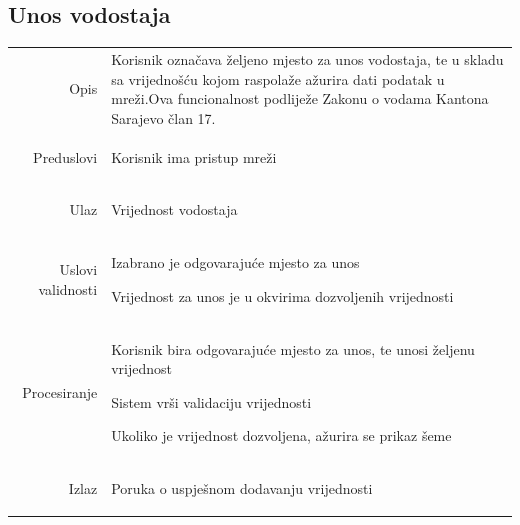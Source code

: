 \documentclass[]{report}
\begin{document}






\subsection{Unos vodostaja}

\begin{tabular}{rp{}}
Opis & 
\hspace{12pt} Korisnik označava željeno mjesto za unos vodostaja, te u skladu sa vrijednošću kojom raspolaže ažurira dati podatak u mreži.Ova funcionalnost podliježe Zakonu o vodama Kantona Sarajevo član 17.

\\
Preduslovi & 
\begin{compactitem}
    \item Korisnik ima pristup mreži
\end{compactitem}

\\
Ulaz & 

\begin{compactitem} 
    \item Vrijednost vodostaja
\end{compactitem}

\\
Uslovi validnosti &

\begin{compactitem} 
    \item Izabrano je odgovarajuće mjesto za unos
    \item Vrijednost za unos je u okvirima dozvoljenih vrijednosti
\end{compactitem}

\\
Procesiranje &

\begin{compactitem} 
    \item Korisnik bira odgovarajuće mjesto za unos, te unosi željenu vrijednost
    \item Sistem vrši validaciju vrijednosti
    \item Ukoliko je vrijednost dozvoljena, ažurira se prikaz šeme
\end{compactitem}

\\
Izlaz &

\begin{compactitem} 
    \item Poruka o uspješnom dodavanju vrijednosti
\end{compactitem}


\end{tabular}
\end{document}
